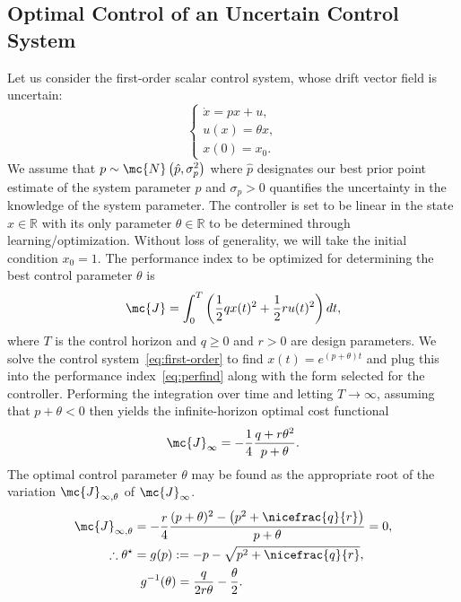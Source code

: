 \subsection{Optimal Control of an Uncertain Control System}
%
Let us consider the first-order scalar control system, whose drift vector field
is uncertain: 
%
\begin{equation} \begin{cases} \dot{x} = px + u, \\ u(x) = \theta x, \\ x(0) =
x_0.  \end{cases} \label{eq:first-order} \end{equation}
%
We assume that $p \sim \mc{N}\left(\hat{p}, \sigma_p^2\right)$ where $\hat{p}$
designates our best prior point estimate of the system parameter $p$ and
$\sigma_p > 0$ quantifies the uncertainty in the knowledge of the system
parameter. The controller is set to be linear in the state $x \in \mathbb{R}$
with its only parameter $\theta \in \mathbb{R}$ to be determined through
learning/optimization. Without loss of generality, we will take the initial
condition $x_0 = 1$. The performance index to be optimized for determining the
best control parameter $\theta$ is
%
\begin{equation} \mc{J} = \int_0^T \left(\frac{1}{2}qx(t)^2 + \frac{1}{2}ru(t)^2 \right) dt,
\label{eq:perfind} \end{equation}
%
where $T$ is the control horizon and $q \geq 0$ and $r > 0$ are design
parameters. We solve the control system~\eqref{eq:first-order} to find $x(t) =
e^{(p+\theta)t}$ and plug this into the performance index~\eqref{eq:perfind}
along with the form selected for the controller. Performing the integration over
time and letting $T \to \infty$, assuming that $p+\theta < 0$ then yields the
infinite-horizon optimal cost functional
\begin{equation} \mc{J}_\infty = -\frac{1}{4}\frac{q+r\theta^2}{p+\theta}.
\label{eq:inf-time-integrated-cost} \end{equation}
%
The optimal control parameter $\theta$ may be found as the appropriate root of
the variation  $\mc{J}_{\infty,\theta}$ of $\mc{J}_\infty$. 
%
\begin{align} 
    \begin{split} 
            \mc{J}_{\infty,\theta} &= -\frac{r}{4}\frac{(p+\theta)^2 - \left(p^2
        + \nicefrac{q}{r}\right)}{p+\theta} = 0, \\ 
        \therefore \theta^\star &= g(p) :=-p - \sqrt{p^2 + \nicefrac{q}{r}}, \\
        &\hspace{2mm} g^{-1}(\theta) = \frac{q}{2r\theta} - \frac{\theta}{2}.
    \end{split} 
    \label{eq:optimal_theta} 
\end{align}
